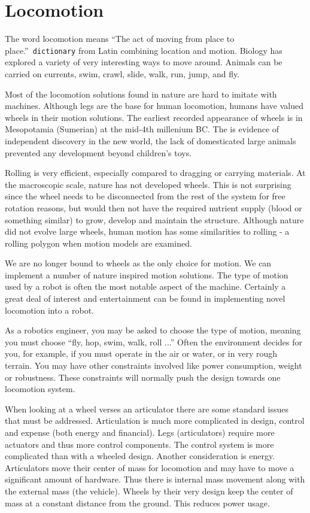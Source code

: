 \hypertarget{locomotion}{%
\section{Locomotion}\label{locomotion}}

The word locomotion means ``The act of moving from place to
place.''~\texttt{dictionary} from Latin combining location and motion.
Biology has explored a variety of very interesting ways to move around.
Animals can be carried on currents, swim, crawl, slide, walk, run, jump,
and fly.

Most of the locomotion solutions found in nature are hard to imitate
with machines. Although legs are the base for human locomotion, humans
have valued wheels in their motion solutions. The earliest recorded
appearance of wheels is in Mesopotamia (Sumerian) at the mid-4th
millenium BC. The is evidence of independent discovery in the new world,
the lack of domesticated large animals prevented any development beyond
children's toys.

Rolling is very efficient, especially compared to dragging or carrying
materials. At the macroscopic scale, nature has not developed wheels.
This is not surprising since the wheel needs to be disconnected from the
rest of the system for free rotation reasons, but would then not have
the required nutrient supply (blood or something similar) to grow,
develop and maintain the structure. Although nature did not evolve large
wheels, human motion has some similarities to rolling - a rolling
polygon when motion models are examined.

We are no longer bound to wheels as the only choice for motion. We can
implement a number of nature inspired motion solutions. The type of
motion used by a robot is often the most notable aspect of the machine.
Certainly a great deal of interest and entertainment can be found in
implementing novel locomotion into a robot.

As a robotics engineer, you may be asked to choose the type of motion,
meaning you must choose ``fly, hop, swim, walk, roll ...'' Often the
environment decides for you, for example, if you must operate in the air
or water, or in very rough terrain. You may have other constraints
involved like power consumption, weight or robustness. These constraints
will normally push the design towards one locomotion system.

When looking at a wheel verses an articulator there are some standard
issues that must be addressed. Articulation is much more complicated in
design, control and expense (both energy and financial). Legs
(articulators) require more actuators and thus more control components.
The control system is more complicated than with a wheeled design.
Another consideration is energy. Articulators move their center of mass
for locomotion and may have to move a significant amount of hardware.
Thus there is internal mass movement along with the external mass (the
vehicle). Wheels by their very design keep the center of mass at a
constant distance from the ground. This reduces power usage.

